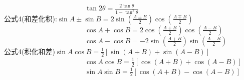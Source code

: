 \documentclass[UTF8]{ctexart}
\begin{document}
\ \ \ \ \ \ \ \ \ \ \ \ \ \ \ \ \ \ \ \ \ \ \ $\displaystyle \tan 2\theta=\frac{2\tan \theta}{1-\tan^{2}\theta}$\\

公式4(和差化积):$\displaystyle \sin A\pm \sin B=2\sin(\frac{A\pm B}{2})\cos(\frac{A\mp B}{2})$\\

\ \ \ \ \ \ \ \ \ \ \ \ \ \ \ \ \ \ \ \ \ \ \ $\displaystyle \cos A+\cos B=2\cos(\frac{A+B}{2})\cos(\frac{A-B}{2})$\\

\ \ \ \ \ \ \ \ \ \ \ \ \ \ \ \ \ \ \ \ \ \ \ $\displaystyle \cos A-\cos B=-2\sin(\frac{A+B}{2})\sin(\frac{A-B}{2})$\\

公式4(积化和差)$\displaystyle \sin A\cos B=\frac{1}{2}\left[\sin(A+B)+\sin(A-B)\right] $\\

\ \ \ \ \ \ \ \ \ \ \ \ \ \ \ \ \ \ \ \ \ \ \ $\displaystyle \cos A\cos B=\frac{1}{2}\left[\cos(A+B)+\cos(A-B)\right] $\\

\ \ \ \ \ \ \ \ \ \ \ \ \ \ \ \ \ \ \ \ \ \ \ $\displaystyle \sin A\sin B=\frac{1}{2}\left[\cos(A+B)-\cos(A-B)\right] $\\
\end{document}
